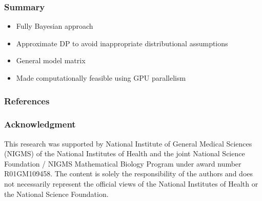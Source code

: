 \documentclass{beamer}
\begin{document}
\begin{frame}
\frametitle{Summary}
  \begin{itemize}
    \item Fully Bayesian approach
    \item Approximate DP to avoid inappropriate distributional assumptions
    \item General model matrix
    \item Made computationally feasible using GPU parallelism
  \end{itemize}
\end{frame}

\begin{frame}[allowframebreaks]
  \tiny
  \frametitle{References}
  
  
\end{frame}

\begin{frame}%
  \frametitle{Acknowledgment}
  \small%
  This research was supported by National Institute of General Medical Sciences (NIGMS) of the National Institutes of Health and the joint National Science Foundation / NIGMS Mathematical Biology Program under award number R01GM109458. The content is solely the responsibility of the authors and does not necessarily represent the official views of the National Institutes of Health or the National Science Foundation.
\end{frame}
\end{document}
